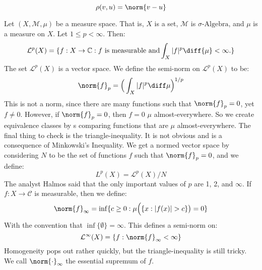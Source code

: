             \begin{equation}
                \rho(v,u)=\norm{v-u}
            \end{equation}
            \begin{lexample}
                Let $(X,\mathcal{M},\mu)$ be a measure space.
                That is, $X$ is a set, $\mathcal{M}$ is
                $\sigma\textrm{-Algebra}$, and $\mu$ is a measure
                on $X$. Let $1\leq{p}<\infty$. Then:
                \begin{equation}
                    \mathcal{L}^{p}(X)=
                    \{f:X\rightarrow\mathbb{C}:
                    f\textrm{ is measurable and}
                    \int_{X}|f|^{p}\diff{\mu}<\infty.\}
                \end{equation}
                The set $\mathcal{L}^{p}(X)$ is a vector space.
                We define the semi-norm on $\mathcal{L}^{p}(X)$
                to be:
                \begin{equation}
                    \norm{f}_{p}=
                    \Big(\int_{X}|f|^{p}\diff\mu\Big)^{1/p}
                \end{equation}
                This is not a norm, since there are many
                functions such that $\norm{f}_{p}=0$, yet $f\ne{0}$.
                However, if $\norm{f}_{p}=0$, then $f=0$ $\mu$
                almost-everywhere. So we create equivalence
                classes by s comparing functions that are $\mu$
                almost-everywhere. The final thing to check is
                the triangle-inequality. It is not obvious and is a
                consequence of Minkowski's Inequality. We get
                a normed vector space by considering $N$ to be
                the set of functions $f$ such that $\norm{f}_{p}=0$,
                and we define:
                \begin{equation}
                    L^{p}(X)=\mathcal{L}^{p}(X)/N
                \end{equation}
                The analyst Halmos said that the only important
                values of $p$ are 1, 2, and $\infty$. If
                $f:X\rightarrow\mathcal{C}$ is
                measurable, then we define:
                \begin{equation}
                    \norm{f}_{\infty}=
                    \inf\{c\geq{0}:\mu\Big(\{x:|f(x)|>c\}\big)=0\}
                \end{equation}
                With the convention that $\inf\{\emptyset\}=\infty$.
                This defines a semi-norm on:
                \begin{equation}
                    \mathcal{L}^{\infty}(X)
                    =\{f:\norm{f}_{\infty}<\infty\}
                \end{equation}
                Homogeneity pops out rather quickly, but the
                triangle-inequality is still tricky. We call
                $\norm{\cdot}_{\infty}$ the essential supremum
                of $f$.
            \end{lexample}
